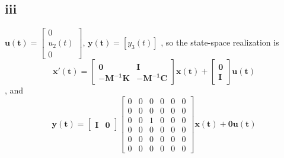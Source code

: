 \documentclass[12pt,a4paper]{article}
\begin{document}
\subsection*{iii}
$\mathbf{u(t)} = \begin{bmatrix}
    0\\
    u_2(t) \\
    0
\end{bmatrix}$, $\mathbf{y(t)} = [y_3(t)]$
, so the state-space realization is
\[
    \mathbf{x'(t)} = \begin{bmatrix}
        \mathbf{0} & \mathbf{I}\\
        \mathbf{-\mathbf{M}^{-1}\mathbf{K}} & \mathbf{-\mathbf{M}^{-1}\mathbf{\mathbf{C}}}
    \end{bmatrix}
    \mathbf{x(t)}+ \begin{bmatrix}
        \mathbf{0}\\
        \mathbf{I}
    \end{bmatrix}\mathbf{u(t)}
\]
, and
\[
    \mathbf{y(t)} = \begin{bmatrix}
        \mathbf{I} & \mathbf{0}
    \end{bmatrix}
    \begin{bmatrix}
        0 & 0 & 0 & 0 & 0 & 0 \\
        0 & 0 & 0 & 0 & 0 & 0 \\
        0 & 0 & 1 & 0 & 0 & 0 \\
        0 & 0 & 0 & 0 & 0 & 0 \\
        0 & 0 & 0 & 0 & 0 & 0 \\
        0 & 0 & 0 & 0 & 0 & 0
    \end{bmatrix}
    \mathbf{x(t)} + 
        \mathbf{0}\mathbf{u(t)}
\]
\end{document}
